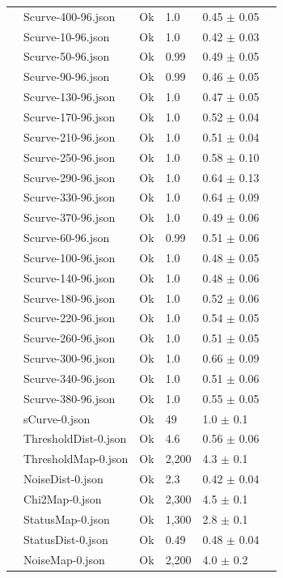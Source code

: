 {\begin{longtable}{|llllll|}
 & Scurve-400-96.json & Ok & 1.0 & 0.45 $\pm$ 0.05 & \\
 & Scurve-10-96.json & Ok & 1.0 & 0.42 $\pm$ 0.03 & \\
 & Scurve-50-96.json & Ok & 0.99 & 0.49 $\pm$ 0.05 & \\
 & Scurve-90-96.json & Ok & 0.99 & 0.46 $\pm$ 0.05 & \\
 & Scurve-130-96.json & Ok & 1.0 & 0.47 $\pm$ 0.05 & \\
 & Scurve-170-96.json & Ok & 1.0 & 0.52 $\pm$ 0.04 & \\
 & Scurve-210-96.json & Ok & 1.0 & 0.51 $\pm$ 0.04 & \\
 & Scurve-250-96.json & Ok & 1.0 & 0.58 $\pm$ 0.10 & \\
 & Scurve-290-96.json & Ok & 1.0 & 0.64 $\pm$ 0.13 & \\
 & Scurve-330-96.json & Ok & 1.0 & 0.64 $\pm$ 0.09 & \\
 & Scurve-370-96.json & Ok & 1.0 & 0.49 $\pm$ 0.06 & \\
 & Scurve-60-96.json & Ok & 0.99 & 0.51 $\pm$ 0.06 & \\
 & Scurve-100-96.json & Ok & 1.0 & 0.48 $\pm$ 0.05 & \\
 & Scurve-140-96.json & Ok & 1.0 & 0.48 $\pm$ 0.06 & \\
 & Scurve-180-96.json & Ok & 1.0 & 0.52 $\pm$ 0.06 & \\
 & Scurve-220-96.json & Ok & 1.0 & 0.54 $\pm$ 0.05 & \\
 & Scurve-260-96.json & Ok & 1.0 & 0.51 $\pm$ 0.05 & \\
 & Scurve-300-96.json & Ok & 1.0 & 0.66 $\pm$ 0.09 & \\
 & Scurve-340-96.json & Ok & 1.0 & 0.51 $\pm$ 0.06 & \\
 & Scurve-380-96.json & Ok & 1.0 & 0.55 $\pm$ 0.05 & \\
 & sCurve-0.json & Ok & 49 & 1.0 $\pm$ 0.1 & \\
 & ThresholdDist-0.json & Ok & 4.6 & 0.56 $\pm$ 0.06 & \\
 & ThresholdMap-0.json & Ok & 2,200 & 4.3 $\pm$ 0.1 & \\
 & NoiseDist-0.json & Ok & 2.3 & 0.42 $\pm$ 0.04 & \\
 & Chi2Map-0.json & Ok & 2,300 & 4.5 $\pm$ 0.1 & \\
 & StatusMap-0.json & Ok & 1,300 & 2.8 $\pm$ 0.1 & \\
 & StatusDist-0.json & Ok & 0.49 & 0.48 $\pm$ 0.04 & \\
 & NoiseMap-0.json & Ok & 2,200 & 4.0 $\pm$ 0.2 & \\

\end{longtable}}
